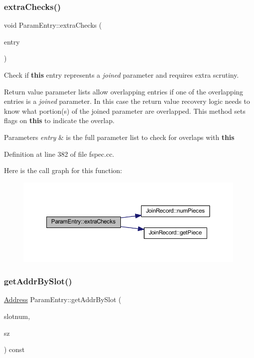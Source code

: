 \subsubsection{\texorpdfstring{extraChecks()}{extraChecks()}}
{\footnotesize\ttfamily void Param\+Entry\+::extra\+Checks (\begin{DoxyParamCaption}\item[{vector$<$ \mbox{\hyperlink{class_param_entry}{Param\+Entry}} $>$ \&}]{entry }\end{DoxyParamCaption})}



Check if {\bfseries{this}} entry represents a {\itshape joined} parameter and requires extra scrutiny. 

Return value parameter lists allow overlapping entries if one of the overlapping entries is a {\itshape joined} parameter. In this case the return value recovery logic needs to know what portion(s) of the joined parameter are overlapped. This method sets flags on {\bfseries{this}} to indicate the overlap. 
\begin{DoxyParams}{Parameters}
{\em entry} & is the full parameter list to check for overlaps with {\bfseries{this}} \\
\hline
\end{DoxyParams}


Definition at line 382 of file fspec.\+cc.

Here is the call graph for this function\+:
\nopagebreak
\begin{figure}[H]
\begin{center}
\leavevmode
\includegraphics[width=350pt]{class_param_entry_af0636e640bf34fb2d6a27f1daa39ba24_cgraph}
\end{center}
\end{figure}
\mbox{\label{class_param_entry_afa742398e87fda08bc9cfaa69304c4be}} 
\subsubsection{\texorpdfstring{getAddrBySlot()}{getAddrBySlot()}}
{\footnotesize\ttfamily \mbox{\hyperlink{class_address}{Address}} Param\+Entry\+::get\+Addr\+By\+Slot (\begin{DoxyParamCaption}\item[{int4 \&}]{slotnum,  }\item[{int4}]{sz }\end{DoxyParamCaption}) const}



